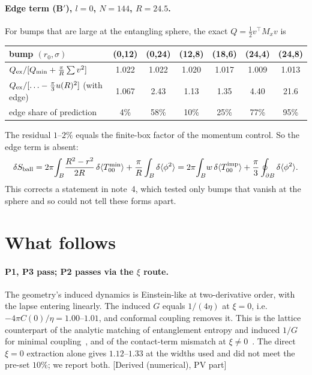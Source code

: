 \documentclass[11pt]{article}
\newcommand{\st}[1]{\textsf{\small[#1]}}
\begin{document}
\paragraph{Edge term (B$'$), $l=0$, $N=144$, $R=24.5$.} For bumps that are large at the entangling sphere, the exact $Q=\tfrac12v^\top M_xv$ is
\begin{center}\small\begin{tabular}{lcccccc}\toprule
bump $(r_0,\sigma)$ & (0,12) & (0,24) & (12,8) & (18,6) & (24,4) & (24,8)\\\midrule
$Q_{\rm ex}/[Q_{\min}+\frac{\pi}{R}\sum v^2]$ & 1.022 & 1.022 & 1.020 & 1.017 & 1.009 & 1.013\\
$Q_{\rm ex}/[\ldots-\frac{\pi}{3}u(R)^2]$ (with edge) & 1.067 & 2.43 & 1.13 & 1.35 & 4.40 & 21.6\\
edge share of prediction & 4\% & 58\% & 10\% & 25\% & 77\% & 95\%\\\bottomrule\end{tabular}\end{center}
The residual $1$--$2\%$ equals the finite-box factor of the momentum control. So the edge term is absent:
\begin{equation}
\delta S_{\rm ball}=2\pi\!\int_B\!\frac{R^2-r^2}{2R}\,\delta\langle T^{\min}_{00}\rangle+\frac{\pi}{R}\int_B\delta\langle\phi^2\rangle
=2\pi\!\int_B\! w\,\delta\langle T^{\rm imp}_{00}\rangle+\frac{\pi}{3}\oint_{\partial B}\delta\langle\phi^2\rangle .
\label{eq:Kball}
\end{equation}
This corrects a statement in note~4, which tested only bumps that vanish at the sphere and so could not tell these forms apart.

\section{What follows}
\paragraph{P1, P3 pass; P2 passes via the $\xi$ route.} The geometry's induced dynamics is Einstein-like at two-derivative order, with the lapse entering linearly. The induced $G$ equals $1/(4\eta)$ at $\xi=0$, i.e.\ $-4\pi C(0)/\eta=1.00$--$1.01$, and conformal coupling removes it. This is the lattice counterpart of the analytic matching of entanglement entropy and induced $1/G$ for minimal coupling~\cite{SU1994}, and of the contact-term mismatch at $\xi\neq0$~\cite{Kabat}. The direct $\xi=0$ extraction alone gives $1.12$--$1.33$ at the widths used and did not meet the pre-set $10\%$; we report both. \st{Derived (numerical), PV part}
\end{document}
